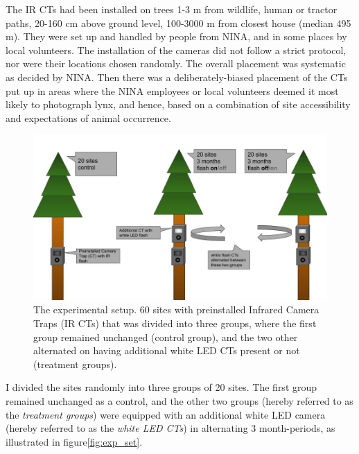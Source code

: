 The IR CTs had been installed on trees 1-3 m from wildlife, human or tractor paths, 20-160 cm above ground level, 100-3000 m from closest house (median 495 m).
They were set up and handled by people from NINA, and in some places by local volunteers. 
The installation of the cameras did not follow a strict protocol, nor were their locations chosen randomly. The overall placement was systematic as decided by NINA. 
Then there was a deliberately-biased placement of the CTs put up in areas where the NINA employees or local volunteers deemed it most likely to photograph lynx, and hence, based on a combination of site accessibility and expectations of animal occurrence. %


\begin{figure}
    \begin{center}
    	\includegraphics[width=\textwidth]{./img/cam_example/experiment_setup.jpg} %
    \end{center}
\caption[The experimental setup]
    	{The experimental setup.  \small %
    	 60 sites with preinstalled Infrared Camera Traps (IR CTs) that was divided into three groups, where the first group remained unchanged (control group), and the two other alternated on having additional white LED CTs present or not (treatment groups).}
    \label{fig:exp_set}
\end{figure} 


I divided the sites randomly into three groups of 20 sites.
The first group remained unchanged as a control, and the other two groups (hereby referred to as the \emph{treatment groups}) were equipped with an additional white LED camera (hereby referred to as the \emph{white LED CTs}) in alternating 3 month-periods, as illustrated in figure\vref{fig:exp_set}.

